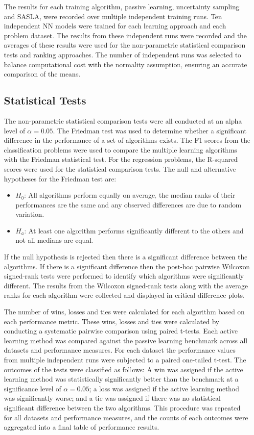 \documentclass[conference]{IEEEtran}
\begin{document}
	The results for each training algorithm, passive learning, uncertainty sampling and SASLA, were recorded over multiple independent training runs. Ten independent NN models were trained for each learning approach and each problem dataset. The results from these independent runs were recorded and the averages of these results were used for the non-parametric statistical comparison tests and ranking approaches. The number of independent runs was selected to balance computational cost with the normality assumption, ensuring an accurate comparison of the means.
	
	\subsection{Statistical Tests}
	The non-parametric statistical comparison tests were all conducted at an alpha level of $\alpha=0.05$. The Friedman test was used to determine whether a significant difference in the performance of a set of algorithms exists. The F1 scores from the classification problems were used to compare the multiple learning algorithms with the Friedman statistical test. For the regression problems, the R-squared scores were used for the statistical comparison tests. The null and alternative hypotheses for the Friedman test are:
	\begin{itemize}
		\item $H_0$: All algorithms perform equally on average, the median ranks of their performances are the same and any observed differences are due to random variation.
		\item $H_a$: At least one algorithm performs significantly different to the others and not all medians are equal.
	\end{itemize}
	If the null hypothesis is rejected then there is a significant difference between the algorithms. If there is a significant difference then the post-hoc pairwise Wilcoxon signed-rank tests were performed to identify which algorithms were significantly different. The results from the Wilcoxon signed-rank tests along with the average ranks for each algorithm were collected and displayed in critical difference plots.
	
	The number of wins, losses and ties were calculated for each algorithm based on each performance metric. These wins, losses and ties were calculated by conducting a systematic pairwise comparison using paired t-tests. Each active learning method was compared against the passive learning benchmark across all datasets and performance measures. For each dataset the performance values from multiple independent runs were subjected to a paired one-tailed t-test. The outcomes of the tests were classified as follows: A win was assigned if the active learning method was statistically significantly better than the benchmark at a significance level of $\alpha=0.05$; a loss was assigned if the active learning method was significantly worse; and a tie was assigned if there was no statistical significant difference between the two algorithms. This procedure was repeated for all datasets and performance measures, and the counts of each outcomes were aggregated into a final table of performance results.
	
\end{document}
